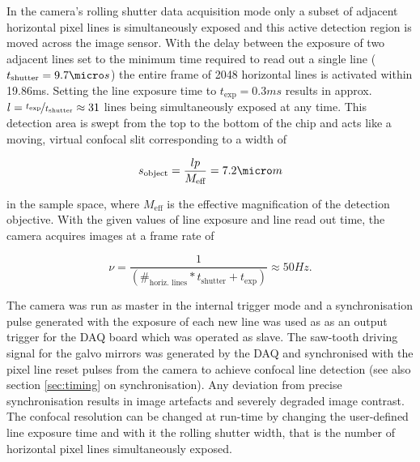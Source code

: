 \documentclass[12pt]{spieman}  %
\begin{document}
In the camera's rolling shutter data acquisition mode only a subset of adjacent horizontal pixel lines is simultaneously exposed and this active detection region is moved across the image sensor\cite{Baumgart2012}. With the delay between the exposure of two adjacent lines set to the minimum time required to read out a single line ($t_{\text{shutter}}=9.7\micro s$) the entire frame of 2048 horizontal lines is activated within 19.86ms. Setting the line exposure time to $t_{\text{exp}}=0.3ms$ results in approx. $l=\nicefrac{t_{\text{exp}}}{t_{\text{shutter}}}\approx31$  lines being simultaneously exposed at any time. This detection area is swept from the top to the bottom of the chip and acts like a moving, virtual confocal slit corresponding to a width of 

\begin{equation}
s_{\text{object}}=\frac{l p}{M_{\text{eff}}}= 7.2 \micro m 
\end{equation}

in the sample space, where $M_{\text{eff}}$ is the effective magnification of the detection objective. With the given values of line exposure and line read out time, the camera acquires images at a frame rate of 

\begin{equation}
\nu = \frac{1}{(\#_{\text{horiz. lines}}*t_{\text{shutter}}+t_{\text{exp}})} \approx 50Hz. 
\end{equation}

The camera was run as master in the internal trigger mode and a synchronisation pulse generated with the exposure of each new line was used as as an output trigger for the DAQ board which was operated as slave. The saw-tooth driving signal for the galvo mirrors was generated by the DAQ and synchronised with the pixel line reset pulses from the camera to achieve confocal line detection\cite{Baumgart2012} (see also section \ref{sec:timing} on synchronisation). Any deviation from precise synchronisation results in image artefacts and severely degraded image contrast. The confocal resolution can be changed at run-time by changing the user-defined line exposure time and with it the rolling shutter width, that is the number of horizontal pixel lines simultaneously exposed.   
 
\end{document}
